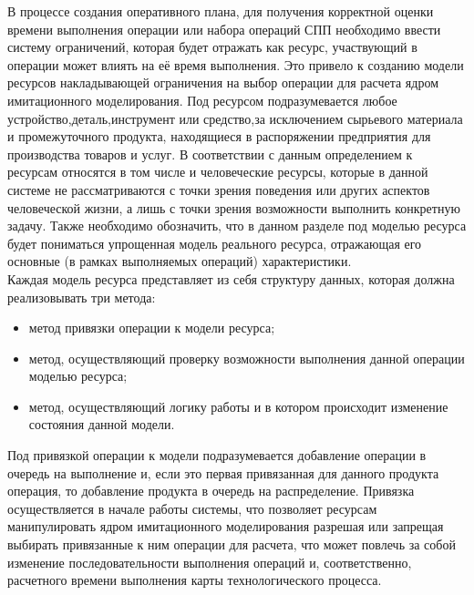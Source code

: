 \indent В процессе создания оперативного плана, для получения корректной оценки времени выполнения операции или набора операций СПП необходимо ввести систему ограничений, которая будет отражать как ресурс, участвующий в операции может влиять на её время выполнения.
Это привело к созданию модели ресурсов накладывающей ограничения на выбор операции для расчета ядром имитационного моделирования.
Под ресурсом подразумевается любое устройство,деталь,инструмент или средство,за исключением сырьевого материала и промежуточного продукта, находящиеся в распоряжении предприятия для производства товаров и услуг.
В соответствии с данным определением к ресурсам относятся в том числе и человеческие ресурсы, которые в данной системе не рассматриваются с точки зрения поведения или других аспектов человеческой жизни, а лишь с точки зрения возможности выполнить конкретную задачу.
Также необходимо обозначить, что в данном разделе под моделью ресурса будет пониматься упрощенная модель реального ресурса, отражающая его основные (в рамках выполняемых операций) характеристики.\\
\indent Каждая модель ресурса представляет из себя структуру данных, которая должна реализовывать три метода:
\begin{itemize}
	\item метод привязки операции к модели ресурса;
	\item метод, осуществляющий проверку возможности выполнения данной операции моделью ресурса;
	\item метод, осуществляющий логику работы и в котором происходит изменение состояния данной модели.
\end{itemize}

\indent Под привязкой операции к модели подразумевается добавление операции в очередь на выполнение и, если это первая привязанная для данного продукта операция, то добавление продукта в очередь на распределение. Привязка осуществляется в начале работы системы, что позволяет ресурсам манипулировать ядром имитационного моделирования разрешая или запрещая выбирать привязанные к ним операции для расчета, что может повлечь за собой изменение последовательности выполнения операций и, соответственно, расчетного времени выполнения карты технологического процесса.

